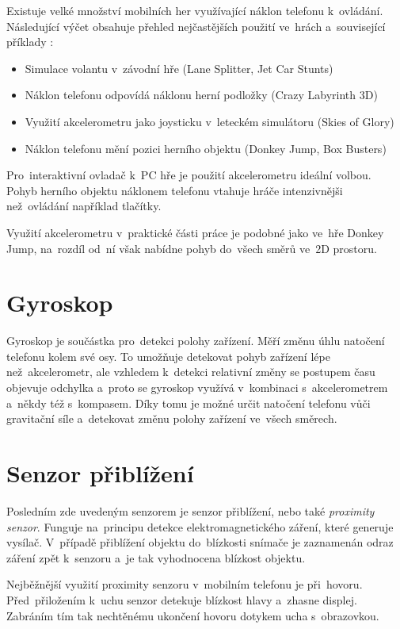 \documentclass[thesis=B,czech,hidelinks]{FITthesis}[2012/06/26] %
\begin{document}
Existuje velké množství mobilních her využívající náklon telefonu k~ovládání. Následující výčet obsahuje přehled nejčastějších použití ve~hrách a~související příklady \cite{accelerometergames}:

\begin{itemize}
	\item Simulace volantu v~závodní hře (Lane Splitter, Jet Car Stunts)
	\item Náklon telefonu odpovídá náklonu herní podložky (Crazy Labyrinth 3D)
	\item Využití akcelerometru jako joysticku v~leteckém simulátoru (Skies of Glory)
	\item Náklon telefonu mění pozici herního objektu (Donkey Jump, Box Busters)
\end{itemize}

Pro~interaktivní ovladač k~PC hře je použití akcelerometru ideální volbou. Pohyb herního objektu náklonem telefonu vtahuje hráče intenzivnějši než~ovládání například tlačítky. 

Využití akcelerometru v~praktické části práce je podobné jako ve~hře Donkey Jump, na~rozdíl od~ní však nabídne pohyb do~všech směrů ve~2D prostoru.

\section{Gyroskop}

Gyroskop je součástka pro~detekci polohy zařízení. Měří změnu úhlu natočení telefonu kolem své osy. To umožňuje detekovat pohyb zařízení lépe než~akcelerometr, ale vzhledem k~detekci relativní změny se postupem času objevuje odchylka a~proto se gyroskop využívá v~kombinaci s~akcelerometrem a~někdy též s~kompasem. Díky tomu je možné určit natočení telefonu vůči gravitační síle a~detekovat změnu polohy zařízení ve~všech směrech. \cite{gyroscope}

\section{Senzor přiblížení}

Posledním zde uvedeným senzorem je senzor přiblížení, nebo také \textit{proximity senzor}. Funguje na~principu detekce elektromagnetického záření, které generuje vysílač. V~případě přiblížení objektu do~blízkosti snímače je zaznamenán odraz záření zpět k~senzoru a~je tak vyhodnocena blízkost objektu. \cite{proximity}

Nejběžnější využití proximity senzoru v~mobilním telefonu je při~hovoru. Před~přiložením k~uchu senzor detekuje blízkost hlavy a~zhasne displej. Zabráním tím tak nechtěnému ukončení hovoru dotykem ucha s~obrazovkou.
\end{document}
